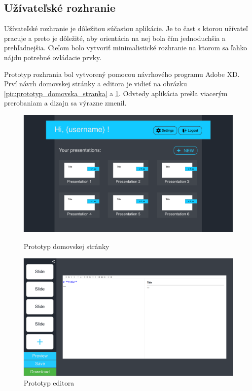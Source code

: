 \subsection{Užívateľské rozhranie}
\label{navrhui}
Užívateľské rozhranie je dôležitou súčasťou aplikácie. Je to čast s ktorou užívateľ pracuje a preto je dôležité, aby orientácia na nej bola čím jednoduchšia a prehľadnejšia. Cieľom bolo vytvoriť minimalistické rozhranie na ktorom sa ľahko nájdu potrebné ovládacie prvky.

Prototyp rozhrania bol vytvorený pomocou návrhového programu Adobe XD. Prví návrh domovskej stránky a editora je vidieť na obrázku \ref{pic:prototyp_domovska_stranka} a \ref{pic:prototyp_editor}. Odvtedy aplikácia prešla viacerým prerobaniam a dizajn sa výrazne zmenil.

\begin{figure}[!hbt]
\centering
\begin{minipage}{.5\textwidth}
  \centering
  \includegraphics[scale=0.1]{obrazky/prototyp_domovska_stranka.png}
  \caption{Prototyp domovskej stránky}
  \label{pic:prototyp_domovska_stranka}
\end{minipage}%
\begin{minipage}{.5\textwidth}
  \centering
  \includegraphics[scale=0.1]{obrazky/prototyp_editor.png}
  \caption{Prototyp editora}
  \label{pic:prototyp_editor}
\end{minipage}
\end{figure}

